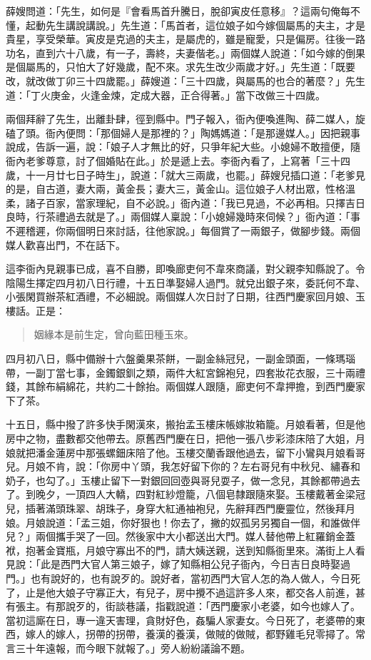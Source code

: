 薛嫂問道：「先生，如何是『會看馬首升騰日，脫卻寅皮任意移』？這兩句俺每不懂，起動先生講說講說。」先生道：「馬首者，這位娘子如今嫁個屬馬的夫主，才是貴星，享受榮華。寅皮是克過的夫主，是屬虎的，雖是寵愛，只是偏房。往後一路功名，直到六十八歲，有一子，壽終，夫妻偕老。」兩個媒人說道：「如今嫁的倒果是個屬馬的，只怕大了好幾歲，配不來。求先生改少兩歲才好。」先生道：「既要改，就改做丁卯三十四歲罷。」薛嫂道：「三十四歲，與屬馬的也合的著麼？」先生道：「丁火庚金，火逢金煉，定成大器，正合得著。」當下改做三十四歲。

兩個拜辭了先生，出離卦肆，徑到縣中。門子報入，衙內便喚進陶、薛二媒人，旋磕了頭。衙內便問：「那個婦人是那裡的？」陶媽媽道：「是那邊媒人。」因把親事說成，告訴一遍，說：「娘子人才無比的好，只爭年紀大些。小媳婦不敢擅便，隨衙內老爹尊意，討了個婚貼在此。」於是遞上去。李衙內看了，上寫著「三十四歲，十一月廿七日子時生」，說道：「就大三兩歲，也罷。」薛嫂兒插口道：「老爹見的是，自古道，妻大兩，黃金長；妻大三，黃金山。這位娘子人材出眾，性格溫柔，諸子百家，當家理紀，自不必說。」衙內道：「我已見過，不必再相。只擇吉日良時，行茶禮過去就是了。」兩個媒人稟說：「小媳婦幾時來伺候？」衙內道：「事不遲稽遲，你兩個明日來討話，往他家說。」每個賞了一兩銀子，做腳步錢。兩個媒人歡喜出門，不在話下。

這李衙內見親事已成，喜不自勝，即喚廊吏何不韋來商議，對父親李知縣說了。令陰陽生擇定四月初八日行禮，十五日準娶婦人過門。就兌出銀子來，委託何不韋、小張閑買辦茶紅酒禮，不必細說。兩個媒人次日討了日期，往西門慶家回月娘、玉樓話。正是：
\begin{quote}
姻緣本是前生定，曾向藍田種玉來。
\end{quote}

四月初八日，縣中備辦十六盤羹果茶餅，一副金絲冠兒，一副金頭面，一條瑪瑙帶，一副丁當七事，金鐲銀釧之類，兩件大紅宮錦袍兒，四套妝花衣服，三十兩禮錢，其餘布絹綿花，共約二十餘抬。兩個媒人跟隨，廊吏何不韋押擔，到西門慶家下了茶。

十五日，縣中撥了許多快手閑漢來，搬抬孟玉樓床帳嫁妝箱籠。月娘看著，但是他房中之物，盡數都交他帶去。原舊西門慶在日，把他一張八步彩漆床陪了大姐，月娘就把潘金蓮房中那張螺鈿床陪了他。玉樓交蘭香跟他過去，留下小鸞與月娘看哥兒。月娘不肯，說：「你房中丫頭，我怎好留下你的？左右哥兒有中秋兒、繡春和奶子，也勾了。」玉樓止留下一對銀回回壺與哥兒耍子，做一念兒，其餘都帶過去了。到晚夕，一頂四人大轎，四對紅紗燈籠，八個皂隸跟隨來娶。玉樓戴著金梁冠兒，插著滿頭珠翠、胡珠子，身穿大紅通袖袍兒，先辭拜西門慶靈位，然後拜月娘。月娘說道：「孟三姐，你好狠也！你去了，撇的奴孤另另獨自一個，和誰做伴兒？」兩個攜手哭了一回。然後家中大小都送出大門。媒人替他帶上紅羅銷金蓋袱，抱著金寶瓶，月娘守寡出不的門，請大姨送親，送到知縣衙里來。滿街上人看見說：「此是西門大官人第三娘子，嫁了知縣相公兒子衙內，今日吉日良時娶過門。」也有說好的，也有說歹的。說好者，當初西門大官人怎的為人做人，今日死了，止是他大娘子守寡正大，有兒子，房中攪不過這許多人來，都交各人前進，甚有張主。有那說歹的，街談巷議，指戳說道：「西門慶家小老婆，如今也嫁人了。當初這廝在日，專一違天害理，貪財好色，姦騙人家妻女。今日死了，老婆帶的東西，嫁人的嫁人，拐帶的拐帶，養漢的養漢，做賊的做賊，都野雞毛兒零撏了。常言三十年遠報，而今眼下就報了。」旁人紛紛議論不題。

